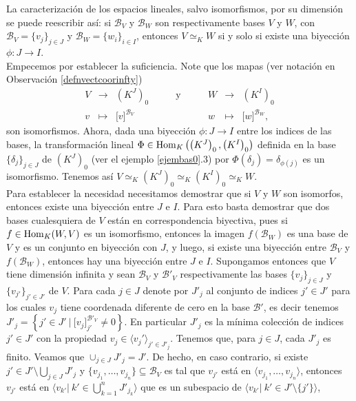 \begin{obs}\label{dimiso}
La caracterizaci\'on de los espacios lineales, salvo isomorfismos, por su dimensi\'on se puede reescribir as\'i: si $\mathcal{B}_V$ y $\mathcal{B}_W$ son respectivamente bases $V$ y $W$, con $\mathcal{B}_V=\{v_j\}_{j\in J}$ y $\mathcal{B}_W=\{w_i\}_{i\in I}$, entonces $V\simeq_K W$ si y solo si existe una biyecci\'on $\phi:J\rightarrow I$.\\
Empecemos por establecer la suficiencia. Note que los mapas (ver notaci\'on en Observaci\'on \ref{defnvectcoorinfty})
\[
\begin{array}{rclcrcl}
V & \longrightarrow & \left(K^{J}\right)_0 &\qquad\textrm{y}\qquad& W & \longrightarrow & \left(K^I\right)_0 \\
v & \longmapsto & \Big[v\Big]^{\mathcal{B}_V} &\qquad& w & \longmapsto & \Big[w\Big]^{\mathcal{B}_W}, 
\end{array}
\]
son isomorfismos. Ahora, dada una biyecci\'on $\phi:J\rightarrow I$ entre los indices de las bases, la transformaci\'on lineal $\Phi\in\operatorname{Hom}_K\left(\left(K^J\right)_0,\left(K^I\right)_0\right)$ definida en la base $\{\delta_j\}_{j\in J}$ de $\left(K^J\right)_0$ (ver el ejemplo \ref{ejembas0}.3) por $\Phi(\delta_j)=\delta_{\phi(j)}$ es un isomorfismo. Tenemos as\'i $V\simeq_K\left(K^J\right)_0\simeq_K\left(K^I\right)_0\simeq_K W$.\\
Para establecer la necesidad necesitamos demostrar que si $V$ y  $W$ son isomorfos, entonces existe una biyecci\'on entre $J$ e $I$. Para esto basta demostrar que dos bases cualesquiera de $V$ est\'an en correspondencia biyectiva, pues si $f\in\operatorname{Hom}_K(W,V)$ es un isomorfismo, entonces la imagen $f(\mathcal{B}_W)$ es una base de $V$ y es un conjunto en biyecci\'on con $J$, y luego, si existe una biyecci\'on entre $\mathcal{B}_V$ y $f\left(\mathcal{B}_W\right)$, entonces hay una biyecci\'on entre $J$ e $I$. Supongamos entonces que $V$ tiene dimensi\'on infinita y sean $\mathcal{B}_V$ y $\mathcal{B}'_V$ respectivamente las bases $\{v_j\}_{j\in J}$ y $\{v_{j'}\}_{j'\in J'}$ de $V$. Para cada $j\in J$ denote por $J'_j$ al conjunto de indices $j'\in J'$ para los cuales $v_j$ tiene coordenada diferente de cero en la base $\mathcal{B}'$, es decir tenemos $J'_j=\left\{j'\in J'\ |\ \Big[v_j\Big]^{\mathcal{B}'_V}_{j'}\ne 0\right\}$. En particular $J'_j$ es la m\'inima colecci\'on de indices $j'\in J'$ con la propiedad $v_j\in\langle v_j'\rangle_{j'\in J'_j}$. Tenemos que, para $j\in J$, cada $J'_j$ es finito. Veamos que $\cup_{j\in J}J'_j=J'$. De hecho, en caso contrario, si existe $j'\in J'\setminus \bigcup_{j\in J}J'_j $ y $\{v_{j_1},\ldots,v_{j_n}\}\subseteq \mathcal{B}_V$ es tal que $v_{j'}$ est\'a en $\langle v_{j_1},\ldots,v_{j_n}\rangle$, entonces $v_{j'}$ est\'a en $\langle v_{k'}|\ k'\in \bigcup_{k=1}^n J'_{j_k} \rangle$ que es un subespacio de $\langle v_{k'}|\ k'\in J'\setminus\{j'\}\rangle$,

\end{obs}
